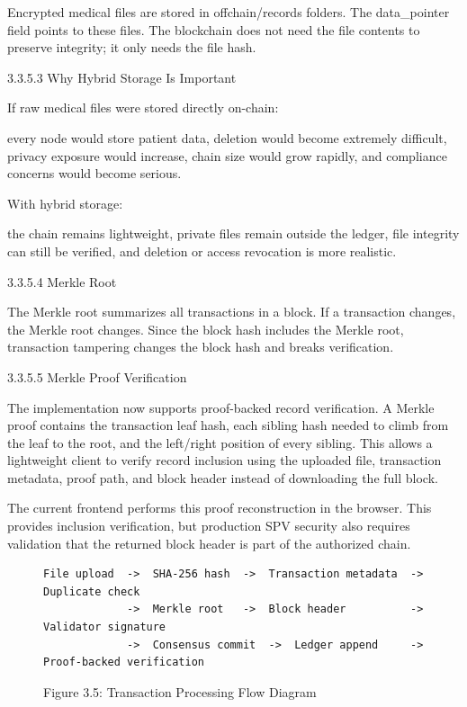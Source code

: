 \documentclass[12pt]{article}
\begin{document}
Encrypted medical files are stored in offchain/records folders. The data\_pointer field points to these files. The blockchain does not need the file contents to preserve integrity; it only needs the file hash.

3.3.5.3 Why Hybrid Storage Is Important

If raw medical files were stored directly on-chain:

 every node would store patient data, deletion would become extremely difficult, privacy exposure would increase, chain size would grow rapidly, and compliance concerns would become serious.

With hybrid storage:

 the chain remains lightweight, private files remain outside the ledger, file integrity can still be verified, and deletion or access revocation is more realistic.

3.3.5.4 Merkle Root

The Merkle root summarizes all transactions in a block. If a transaction changes, the Merkle root changes. Since the block hash includes the Merkle root, transaction tampering changes the block hash and breaks verification.

3.3.5.5 Merkle Proof Verification

The implementation now supports proof-backed record verification. A Merkle proof contains the transaction leaf hash, each sibling hash needed to climb from the leaf to the root, and the left/right position of every sibling. This allows a lightweight client to verify record inclusion using the uploaded file, transaction metadata, proof path, and block header instead of downloading the full block.

The current frontend performs this proof reconstruction in the browser. This provides inclusion verification, but production SPV security also requires validation that the returned block header is part of the authorized chain.

\begin{figure}[htbp]
\centering
\scriptsize
\begin{verbatim}
File upload  ->  SHA-256 hash  ->  Transaction metadata  ->  Duplicate check
             ->  Merkle root   ->  Block header          ->  Validator signature
             ->  Consensus commit  ->  Ledger append     ->  Proof-backed verification
\end{verbatim}
\label{fig:3.5}
\caption*{Figure 3.5: Transaction Processing Flow Diagram}
\end{figure}
\end{document}
